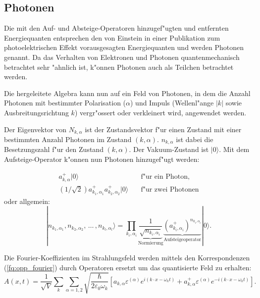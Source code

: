 \subsection{Photonen}

Die mit den Auf- und Absteige-Operatoren hinzugef"ugten und entfernten Energiequanten entsprechen den von Einstein in einer Publikation zum photoelektrischen Effekt vorausgesagten Energiequanten und werden Photonen genannt. Da das Verhalten von Elektronen und Photonen quantenmechanisch betrachtet sehr "ahnlich ist, k"onnen Photonen auch als Teilchen betrachtet werden.

Die hergeleitete Algebra kann nun auf ein Feld von Photonen, in dem die Anzahl Photonen mit bestimmter Polarisation ($\alpha$) und Impuls (Wellenl"ange $|k|$ sowie Ausbreitungsrichtung $k$) vergr"ossert oder verkleinert wird, angewendet werden.

Der Eigenvektor von $N_{k,\alpha}$ ist der Zustandsvektor f"ur einen Zustand mit einer bestimmten Anzahl Photonen im Zustand $(k,\alpha)$. $n_{k,\alpha}$ ist dabei die Besetzungszahl f"ur den Zustand $(k,\alpha)$. Der Vakuum-Zustand ist $|0\rangle$. Mit dem Aufsteige-Operator k"onnen nun Photonen hinzugef"ugt werden:

\begin{align*}
a^+_{k,\alpha}|0\rangle & \quad \text{f"ur ein Photon,}\\
\left(1/\sqrt{2}\right)a^+_{k_1,\alpha_1}a^+_{k_2,\alpha_2}|0\rangle & \quad \text{f"ur zwei Photonen}
\end{align*}
oder allgemein:
\begin{equation*}
|n_{k_1,\alpha_1}, n_{k_2,\alpha_2}, \, \hdots \, , n_{k_l,\alpha_l}\rangle =
 \prod_{k_i,\alpha_i}\underbrace{\frac{1}{\sqrt{n_{k_i,\alpha_i}}}}_{\text{Normierung}} \underbrace{\left(a^+_{k_i,\alpha_i}\right)^{n_{k_i,\alpha_i}}}_{\text{Aufsteigeoperator}} |0\rangle.
\end{equation*}

Die Fourier-Koeffizienten im Strahlungsfeld werden mittels den Korrespondenzen (\ref{fq:opp_fourier}) durch Operatoren ersetzt um das quantisierte Feld zu erhalten:
\begin{equation*}
A(x,t) = \frac{1}{\sqrt{V}} \sum_k \sum_{\alpha=1,2} \sqrt{\frac{\hbar}{2 \varepsilon_0 \omega_k}} \left[a_{k,\alpha} \varepsilon^{(\alpha)} e^{i (k \cdot x - \omega_k t)} + a^+_{k,\alpha} \varepsilon^{(\alpha)} e^{-i (k \cdot x - \omega_k t)}\right].
\end{equation*}

